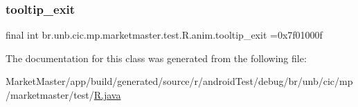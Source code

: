 \subsubsection{\texorpdfstring{tooltip\+\_\+exit}{tooltip\_exit}}
{\footnotesize\ttfamily final int br.\+unb.\+cic.\+mp.\+marketmaster.\+test.\+R.\+anim.\+tooltip\+\_\+exit =0x7f01000f\hspace{0.3cm}{\ttfamily [static]}}



The documentation for this class was generated from the following file\+:\begin{DoxyCompactItemize}
\item 
Market\+Master/app/build/generated/source/r/android\+Test/debug/br/unb/cic/mp/marketmaster/test/\mbox{\hyperlink{androidTest_2debug_2br_2unb_2cic_2mp_2marketmaster_2test_2R_8java}{R.\+java}}\end{DoxyCompactItemize}
